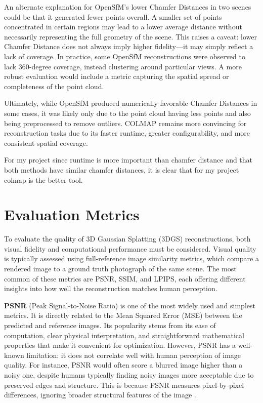 \documentclass[10pt,twocolumn]{article}
\begin{document}
An alternate explanation for OpenSfM's lower Chamfer Distances in two scenes could be that it generated fewer points overall. A smaller set of points concentrated in certain regions may lead to a lower average distance without necessarily representing the full geometry of the scene. This raises a caveat: lower Chamfer Distance does not always imply higher fidelity—it may simply reflect a lack of coverage. In practice, some OpenSfM reconstructions were observed to lack 360-degree coverage, instead clustering around particular views. A more robust evaluation would include a metric capturing the spatial spread or completeness of the point cloud.

Ultimately, while OpenSfM produced numerically favorable Chamfer Distances in some cases, it was likely only due to the point cloud having less points and also being preprocessed to remove outliers. COLMAP remains more convincing for reconstruction tasks due to its faster runtime, greater configurability, and more consistent spatial coverage. 

For my project since runtime is more important than chamfer distance and that both methods have similar chamfer distances, it is clear that for my project colmap is the better tool.









\section{Evaluation Metrics}

To evaluate the quality of 3D Gaussian Splatting (3DGS) reconstructions, both visual fidelity and computational performance must be considered. Visual quality is typically assessed using full-reference image similarity metrics, which compare a rendered image to a ground truth photograph of the same scene. The most common of these metrics are PSNR, SSIM, and LPIPS, each offering different insights into how well the reconstruction matches human perception.

\textbf{PSNR} (Peak Signal-to-Noise Ratio) is one of the most widely used and simplest metrics. It is directly related to the Mean Squared Error (MSE) between the predicted and reference images. Its popularity stems from its ease of computation, clear physical interpretation, and straightforward mathematical properties that make it convenient for optimization. However, PSNR has a well-known limitation: it does not correlate well with human perception of image quality. For instance, PSNR would often score a blurred image higher than a noisy one, despite humans typically finding noisy images more acceptable due to preserved edges and structure. This is because PSNR measures pixel-by-pixel differences, ignoring broader structural features of the image \cite{1284395}.
\end{document}
